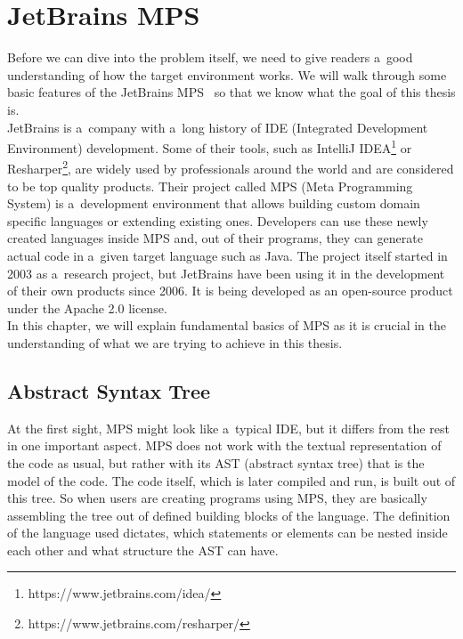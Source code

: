 \chapter{JetBrains MPS}
\label{chap:jetbrains_mps}

Before we can dive into the problem itself, we need to give readers a~good understanding of how the target environment works.
We will walk through some basic features of the JetBrains MPS~\cite{MPS} so that we know what the goal of this thesis is.
\\

JetBrains is a~company with a~long history of IDE (Integrated Development Environment) development.
Some of their tools, such as IntelliJ IDEA\footnote{https://www.jetbrains.com/idea/} or Resharper\footnote{https://www.jetbrains.com/resharper/}, are widely used by professionals around the world and are considered to be top quality products.
Their project called MPS (Meta Programming System) is a~development environment that allows building custom domain specific languages or extending existing ones.
Developers can use these newly created languages inside MPS and, out of their programs, they can generate actual code in a~given target language such as Java.
The project itself started in 2003 as a~research project, but JetBrains have been using it in the development of their own products since 2006.
It is being developed as an open-source product under the Apache 2.0 license.
\\

In this chapter, we will explain fundamental basics of MPS as it is crucial in the understanding of what we are trying to achieve in this thesis.

\section{Abstract Syntax Tree}
At the first sight, MPS might look like a~typical IDE, but it differs from the rest in one important aspect.
MPS does not work with the textual representation of the code as usual, but rather with its AST (abstract syntax tree) that is the model of the code.
The code itself, which is later compiled and run, is built out of this tree.
So when users are creating programs using MPS, they are basically assembling the tree out of defined building blocks of the language.
The definition of the language used dictates, which statements or elements can be nested inside each other and what structure the AST can have.
\\

